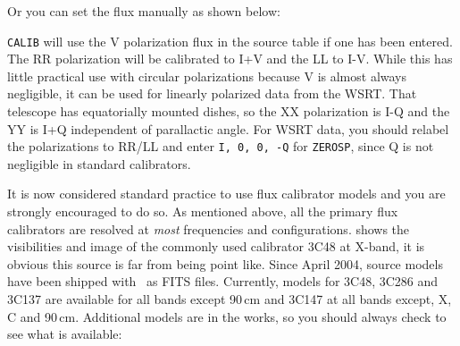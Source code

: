 Or you can set the flux manually as shown below:

{\tt CALIB} will use the V polarization flux in the source table if
one has been entered.  The RR polarization will be calibrated to I+V
and the LL to I-V.  While this has little practical use with circular
polarizations because V is almost always negligible, it can be used
for linearly polarized data from the WSRT\@.  That telescope has
equatorially mounted dishes, so the XX polarization is I-Q and the
YY is I+Q independent of parallactic angle.  For WSRT data, you should
relabel the polarizations to RR/LL and enter {\tt I, 0, 0, -Q} for
{\tt ZEROSP}, since Q is not negligible in standard calibrators.



It is now considered standard practice to use flux calibrator models
and you are strongly encouraged to do so.  As mentioned above, all the
primary flux calibrators are resolved at {\it most} frequencies and
configurations.   shows the visibilities and image of
the commonly used calibrator 3C48 at X-band, it is obvious this source
is far from being point like.  Since April 2004, source models have
been shipped with \AIPS\ as FITS files. Currently, models for 3C48,
3C286 and 3C137 are available for all bands except 90\,cm and 3C147 at
all bands except, X, C and 90\,cm.  Additional models are in the
works, so you should always check to see what is available:

